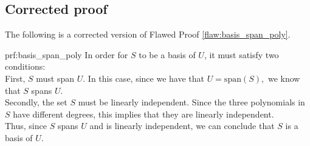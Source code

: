 \clearpage
\subsection{Corrected proof}

The following is a corrected version of Flawed Proof \ref{flaw:basis_span_poly}. %

\begin{prf}{prf:basis_span_poly} %
In order for $S$ to be a basis of $U$, it must satisfy two conditions: \\

First, $S$ must span $U$. In this case, since we have that $U =\text{span}(S),$ we know that $S$ spans $U.$ \\

Secondly, the set $S$ must be linearly independent. Since the three polynomials in $S$ have different degrees, this implies that they are linearly independent. \\

Thus, since $S$ spans $U$ and is linearly independent, we can conclude that $S$ is a basis of $U.$
\end{prf}
